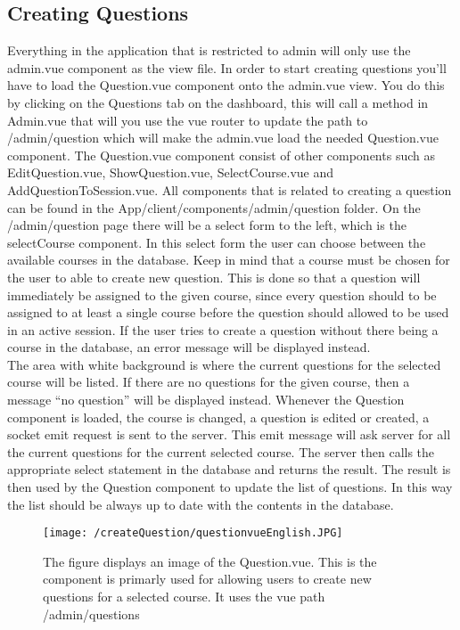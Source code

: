 \subsection{Creating Questions}
Everything in the application that is restricted to admin will only use the admin.vue component as the view file. In order to start creating questions you’ll have to load the Question.vue component onto the admin.vue view. You do this by clicking on the Questions tab on the dashboard, this will call a method in Admin.vue that will you use the vue router to update the path to /admin/question which will make the admin.vue load the needed Question.vue component. The Question.vue component consist of other components such as EditQuestion.vue, ShowQuestion.vue, SelectCourse.vue and AddQuestionToSession.vue. All components that is related to creating a question can be found in the App/client/components/admin/question folder. On the /admin/question page there will be a select form to the left, which is the selectCourse component. In this select form the user can choose between the available courses in the database. Keep in mind that a course must be chosen for the user to able to create new question. This is done so that a question will immediately be assigned to the given course, since every question should to be assigned to at least a single course before the question should allowed to be used in an active session.  If the user tries to create a question without there being a course in the database, an error message will be displayed instead.\\[11pt]
The area with white background is where the current questions for the selected course will be listed. If there are no questions for the given course, then a message “no question” will be displayed instead. Whenever the Question component is loaded, the course is changed, a question is edited or created, a socket emit request is sent to the server. This emit message will ask server for all the current questions for the current selected course. The server then calls the appropriate select statement in the database and returns the result. The result is then used by the Question component to update the list of questions. In this way the list should be always up to date with the contents in the database. 
\begin{figure}[h]
	\centering
	\texttt{[image: /createQuestion/questionvueEnglish.JPG]}
	\caption{The figure displays an image of the Question.vue. This is the component is primarly used for allowing users to create new questions for a selected course. It uses the vue path /admin/questions}
	\label{fig:questionVue}
\end{figure}
